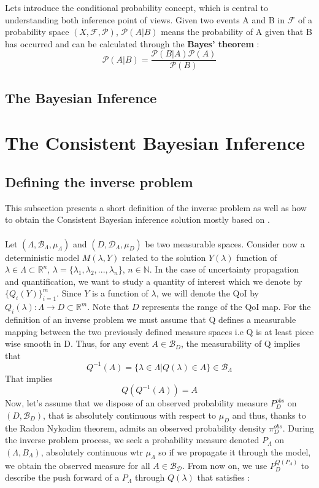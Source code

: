 \documentclass[11pt, a4paper, English]{report}
\begin{document}
Lets introduce the conditional probability concept, which is central to understanding both inference point of views. Given two events A and B in $\mathcal{F}$ of a probability space $(X, \mathcal{F}, \mathcal{P})$, $\mathcal{P}(A|B)$ means the probability of A given that B has occurred and can be calculated through the \textbf{Bayes' theorem} :
$$\mathcal{P}(A|B)=\frac{\mathcal{P}(B|A)\mathcal{P}(A)}{\mathcal{P}(B)}$$


\subsection{The Bayesian Inference}
\section{The Consistent Bayesian Inference}
\subsection{Defining the inverse problem}
This subsection presents a short definition of the inverse problem as well as how to obtain the Consistent Bayesian inference solution mostly based on \cite{Tim1}. \\\\
Let $(\Lambda, \mathcal{B}_\Lambda, \mu_\Lambda)$ and  $(D, \mathcal{D}_\Lambda, \mu_D)$ be two measurable spaces. Consider now a deterministic model $M(\lambda, Y)$ related to the solution $Y(\lambda)$ function of $\lambda \in \Lambda \subset \mathbb{R}^n$, $\lambda =\{\lambda_1, \lambda_2,..., \lambda_n$\}, $n \in \mathbb{N}$. In the case of uncertainty propagation and quantification, we want to study a quantity of interest which we denote by $\{Q_i(Y)\}_{i=1}^{m}$. Since $Y$ is a function of $\lambda$, we will denote the QoI by $Q_i(\lambda) : \Lambda \rightarrow D \subset \mathbb{R}^m$. Note that $D$ represents the range of the QoI map. For the definition of an inverse problem we must assume that Q defines a measurable mapping between the two previously defined measure spaces i.e Q is at least piece wise smooth in D. Thus, for any event $A \in \mathcal{B}_D$, the measurability of Q implies that 
$$ Q^{-1}(A) = \{ \lambda \in \Lambda | Q(\lambda) \in A\} \in \mathcal{B}_\Lambda $$
That implies 
$$Q(Q^{-1}(A)) = A $$
Now, let's assume that we dispose of an observed probability measure $P_D^{obs}$ on $(D, \mathcal{B}_D)$, that is absolutely continuous with respect to $\mu_D$ and thus, thanks to the Radon Nykodim theorem, admits an observed probability density $\pi_D^{obs}$. During the inverse problem process, we seek a probability measure denoted $P_\Lambda$ on $(\Lambda, B_\Lambda)$, absolutely continuous wtr $\mu_\Lambda$ so if we propagate it through the model, we obtain the observed measure for all $A \in \mathcal{B_D}$. From now on, we use $P_D^{Q(P_\Lambda)}$ to describe the push forward of a $P_\Lambda$ through $Q(\lambda)$ that satisfies :
\end{document}
